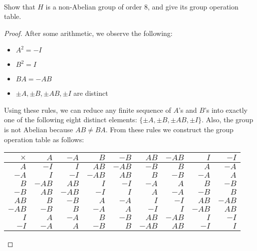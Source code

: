 \documentclass{article}
\begin{document}
\begin{enumerate}
\begin{enumerate}
\begin{align*}
        \end{align*}
        Show that $H$ is a non-Abelian group of order 8, and give its group
        operation table.
        \begin{proof}
          After some arithmetic, we observe the following:
          \begin{itemize}
            \item $A^2=-I$
            \item $B^2=I$
            \item $BA=-AB$
            \item $\pm A, \pm B, \pm AB, \pm I$ are distinct 
          \end{itemize}
          Using these rules, we can reduce any finite sequence of $A$'s and
          $B$'s into exactly one of the following eight distinct elements:
          $\{\pm A, \pm B, \pm AB, \pm I\}$. Also, the group is not Abelian
          because $AB\neq BA$. From these rules we construct the group
          operation table as follows: \\
          \begin{center}
            \begin{tabular}{|r||r|r|r|r|r|r|r|r|}
              \hline
              $\times$  & $A$   & $-A$  & $B$   & $-B$  & $AB$  & $-AB$ & $I$   & $-I$ \\
              \hline\hline
              $A$       & $-I$  & $I$   & $AB$  & $-AB$ & $-B$  & $B$   & $A$   & $-A$ \\
              \hline
              $-A$      & $I$   & $-I$  & $-AB$ & $AB$  & $B$   & $-B$  & $-A$  & $A$ \\
              \hline
              $B$       & $-AB$ & $AB$  & $I$   & $-I$  & $-A$  & $A$   & $B$   & $-B$ \\
              \hline
              $-B$      & $AB$  & $-AB$ & $-I$  & $I$   & $A$   & $-A$  & $-B$  & $B$ \\
              \hline
              $AB$      & $B$   & $-B$  & $A$   & $-A$  & $I$   & $-I$  & $AB$  & $-AB$ \\
              \hline
              $-AB$     & $-B$  & $B$   & $-A$  & $A$   & $-I$  & $I$   & $-AB$ & $AB$ \\
              \hline
              $I$       & $A$   & $-A$  & $B$   & $-B$  & $AB$  & $-AB$ & $I$   & $-I$ \\
              \hline
              $-I$      & $-A$  & $A$   & $-B$  & $B$   & $-AB$ & $AB$  & $-I$  & $I$ \\

\end{tabular}
\end{center}
\end{proof}
\end{enumerate}
\end{enumerate}
\end{document}
